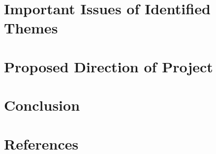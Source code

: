 \documentclass[14pt]{article}
\begin{document}
\section{Important Issues of Identified Themes}

\section{Proposed Direction of Project}

\section{Conclusion}
\section{References}\label{references}
\printbibliography
\end{document}
